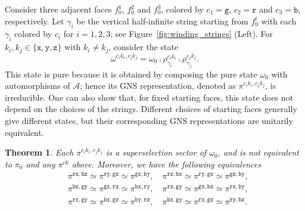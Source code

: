 \documentclass[a4paper,11pt]{article}
\newtheorem{theorem}{Theorem}[section]
\theoremstyle{definition}
\theoremstyle{remark}
\theoremstyle{remark}
\begin{document}
Consider three adjacent faces $f_0^1$, $f_0^2$ and $f_0^3$, colored by $c_1=\mathtt{g}$, $c_2=\mathtt{r}$ and $c_3=\mathtt{b}$, respectively.  Let $\gamma_i$ be the vertical half-infinite string starting from $f_0^i$ with each $\gamma_i$ colored by $c_i$ for $i=1,2,3$; see Figure~\ref{fig:winding_strings} (Left). 
For $k_i, k_j\in \{\mathtt{x},\mathtt{y},\mathtt{z}\}$ with $k_i \neq k_j$, consider the state 
\begin{equation*}
    \omega^{c_ik_i,c_jk_j} = \omega_0\comp \rho_{\gamma_i}^{c_ik_i}\comp \rho_{\gamma_j}^{c_jk_j}.
\end{equation*}
This state is pure because it is obtained by composing the pure state $\omega_0$ with automorphisms of $\mathcal{A}$; hence its GNS representation, denoted as $\pi^{c_ik_i,c_jk_j}$, is irreducible. 
One can also show that, for fixed starting faces, this state does not depend on the choices of the strings. Different choices of starting faces generally give different states, but their corresponding GNS representations are unitarily equivalent.

\begin{theorem} \label{thm:sectors_fermion}
    Each $\pi^{c_ik_i,c_jk_j}$ is a superselection sector of $\omega_0$, and is not equivalent to $\pi_0$ and any $\pi^{ck}$ above. Moreover, we have the following equivalences 
    \begin{align*}
        &\pi^{\mathtt{rx},\mathtt{bz}} \simeq \pi^{\mathtt{ry},\mathtt{gz}} \simeq \pi^{\mathtt{gx},\mathtt{by}},\quad 
        \pi^{\mathtt{rz},\mathtt{bx}} \simeq \pi^{\mathtt{ry},\mathtt{gx}} \simeq \pi^{\mathtt{gz},\mathtt{by}}, \\
        & \pi^{\mathtt{bz},\mathtt{gy}} \simeq \pi^{\mathtt{gx},\mathtt{rz}} \simeq \pi^{\mathtt{bx},\mathtt{ry}}, \quad \pi^{\mathtt{rz},\mathtt{gy}} \simeq \pi^{\mathtt{gx},\mathtt{bz}} \simeq \pi^{\mathtt{rx},\mathtt{by}}, \\
        & \pi^{\mathtt{rx},\mathtt{gy}} \simeq \pi^{\mathtt{bx},\mathtt{gz}} \simeq \pi^{\mathtt{by},\mathtt{rz}}, \quad
        \pi^{\mathtt{bx},\mathtt{gy}} \simeq \pi^{\mathtt{rx},\mathtt{gz}} \simeq \pi^{\mathtt{ry},\mathtt{bz}}. 
    \end{align*}
\end{theorem}
\end{document}
